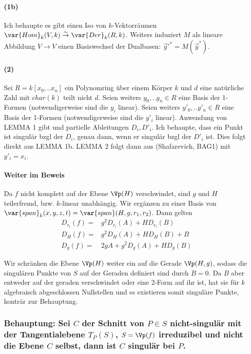 \paragraph{(1b)}
Ich behaupte es gibt einen Iso von $k$-Vektorräumen $\var{Hom}_k(V,k) \overset\sim\to \var{Der}_k(R,k)$.
Weiters induziert $M$ als lineare Abbildung $V \to V$ einen Basiswechsel der Dualbasen: $\vec y'^* = M(\vec y^*)$.

\paragraph{(2)} 
Sei $R = k[x_0,..x_n]$ ein Polynomring über einem Körper $k$ und $d$ eine natürliche Zahl mit $char(k)$ teilt nicht $d$.
Seien weiters $y_0,..y_n \in R$ eine Basis der 1-Formen (notwendigerweise sind die $y_i$ linear).
Seien weiters $y'_0,..y'_n \in R$ eine Basis der 1-Formen (notwendigerweise sind die $y'_i$ linear).
Anwendung von LEMMA 1 gibt und partielle Ableitungen $D_i, D'_i$.
Ich behaupte, dass ein Punkt ist singulär bzgl der $D_i$, genau dann, wenn er singulär bzgl der $D'_i$ ist.
Dies folgt direkt aus LEMMA 1b.
LEMMA 2 folgt dann aus (Shafarevich, BAG1) mit $y'_i = x_i$.


\paragraph{Weiter im Beweis}
Da $f$ nicht komplett auf der Ebene $\Vp(H)$ verschwindet, sind $g$ und $H$ teilerfremd, bzw. $k$-linear unabhängig. Wir ergänzen zu einer Basis von $\var{span}_k(x,y,z,t) = \var{span}(H,g,r_1,r_2)$.
Dann gelten
\begin{align*}
D_{r_i}(f) =& g^2 D_{r_i}(A)  + H D_{r_i}(B) \\
D_H(f)     =& g^2 D_H(A)      + H D_H(B) + B \\
D_g(f)     =& 2gA + g^2D_g(A) + H D_g(B)
\end{align*}

Wir schränken die Ebene $\Vp(H)$ weiter ein auf die Gerade $\Vp(H,g)$, sodass die singulären Punkte von $S$ auf der Geraden definiert sind durch $B = 0$.
Da $B$ aber entweder auf der geraden verschwindet oder eine 2-Form auf ihr ist, hat sie für $k$ algebraisch abgeschlossen Nullstellen und es existieren somit singuläre Punkte, konträr zur Behauptung.


\subsubsection{ %
Behauptung: Sei $C$ der Schnitt von $P \in S$ nicht-singulär mit der Tangentialebene $T_P(S)$, $S = \Vp(f)$ irreduzibel und nicht die Ebene $C$ selbst, dann ist $C$ singulär bei $P$.
} %

